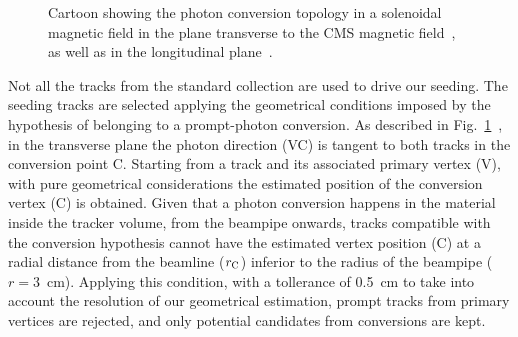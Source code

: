 \documentclass[a4paper]{jpconf}
\begin{document}
\begin{figure}[]
\centering
{}
\caption{Cartoon showing the photon conversion topology in a solenoidal magnetic field in the plane transverse  to the CMS magnetic field~, as well as  in the longitudinal plane~.}

\label{fig:algo}
\end{figure}

Not all the tracks from  the standard collection are used to drive our seeding. The seeding tracks are selected applying the geometrical conditions imposed by the hypothesis of belonging to a prompt-photon conversion. 
%
As described in Fig.~\ref{fig:algo}~, in the transverse plane the photon direction (VC) is tangent to both tracks in the conversion point C. Starting from a track and its associated primary vertex (V), with pure geometrical considerations the estimated position of the conversion vertex (C) is obtained. Given that a photon conversion happens in the material inside the tracker volume, from the beampipe onwards, tracks compatible with the conversion hypothesis cannot have the estimated vertex position (C) at a radial distance from the beamline ($r\rm _C$) inferior to the radius of the beampipe ($r=3$~cm). Applying this condition, with a tollerance of 0.5~cm to take into account the resolution of our geometrical estimation,  prompt tracks from primary vertices are rejected, and only potential candidates from conversions are kept.
\end{document}

